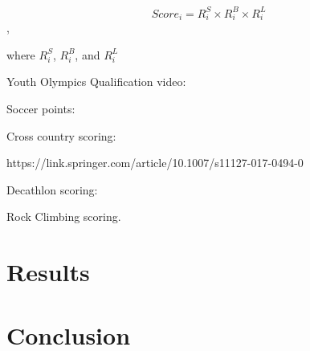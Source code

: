 \documentclass{article}\usepackage[]{graphicx}\usepackage[]{color}
\begin{document}
$$
Score_i = R^S_i \times R^B_i \times R^L_i
$$, 

where $R^S_i$, $R^B_i$, and $R^L_i$ 




Youth Olympics Qualification video: %









Soccer points: %

Cross country scoring: %

https://link.springer.com/article/10.1007/s11127-017-0494-0

Decathlon scoring: %

Rock Climbing scoring.  

\section{Results}

\section{Conclusion}



\end{document}
